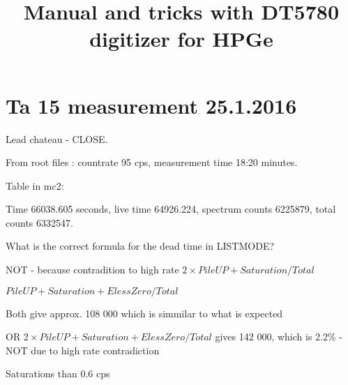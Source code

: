 \documentclass[12pt]{article}
\begin{document}
%
 \title{Manual and tricks with DT5780 digitizer for HPGe}
 \maketitle

 \section{Ta 15 measurement 25.1.2016 }

 Lead chateau - CLOSE.
 
 From root files : countrate 95 cps, measurement time 18:20 minutes.

 Table in mc2:

 Time 66038.605 seconds, live time 64926.224,
 spectrum counts 6225879,  total counts 6332547.

 
\begin{table}[!ht]
\end{table}

 
What is the correct formula for the dead time in LISTMODE?

NOT - because contradition to high rate $ 2 \times PileUP + Saturation / Total $

$  PileUP + Saturation + ElessZero / Total $ 

Both give approx. 108 000 which is simmilar to what is expected
\vskip 3mm

OR $  2 \times PileUP + Saturation + ElessZero / Total $  gives 142 000, which is 2.2\% - NOT due to high rate contradiction

Saturations than 0.6 cps
\end{document}
